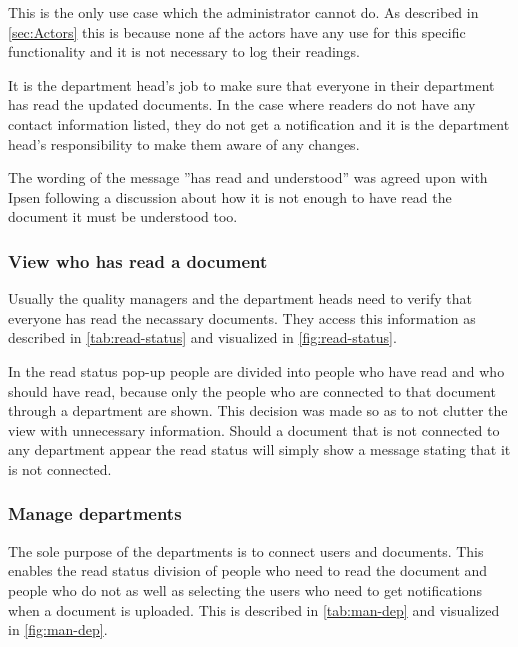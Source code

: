 


This is the only use case which the administrator cannot do.
As described in \cref{sec:Actors} this is because none af the actors have any use for this specific functionality and it is not necessary to log their readings.

It is the department head's job to make sure that everyone in their department has read the updated documents.
In the case where readers do not have any contact information listed, they do not get a notification and it is the department head's responsibility to make them aware of any changes.

The wording of the message ''has read and understood'' was agreed upon with Ipsen following a discussion about how it is not enough to have read the document it must be understood too.

\subsubsection{View who has read a document}

Usually the quality managers and the department heads need to verify that everyone has read the necassary documents.
They access this information as described in \cref{tab:read-status} and visualized in \cref{fig:read-status}.




In the read status pop-up people are divided into people who have read and who should have read, because only the people who are connected to that document through a department are shown.
This decision was made so as to not clutter the view with unnecessary information.
Should a document that is not connected to any department appear the read status will simply show a message stating that it is not connected.

\subsubsection{Manage departments}\label{managedepartments}
The sole purpose of the departments is to connect users and documents.
This enables the read status division of people who need to read the document and people who do not as well as selecting the users who need to get notifications when a document is uploaded.
This is described in \cref{tab:man-dep} and visualized in \cref{fig:man-dep}.

